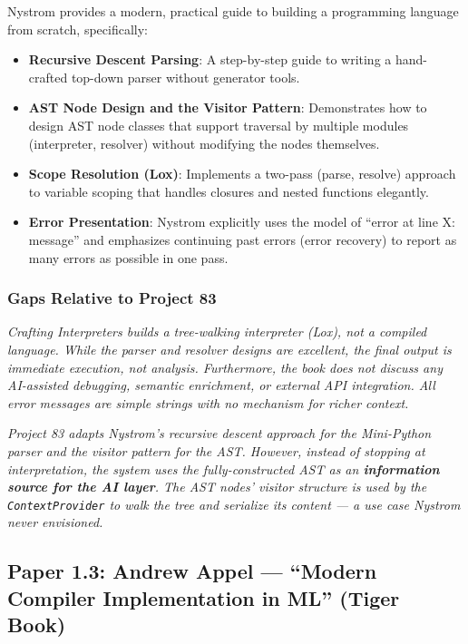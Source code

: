 \documentclass[a4paper,11pt]{article}
\newcommand{\papergap}[1]{%
  \begin{tcolorbox}[colback=red!5!white, colframe=red!60!black, title={Research Gap Identified}]
  \textit{#1}
  \end{tcolorbox}
}
\newcommand{\oursolution}[1]{%
  \begin{tcolorbox}[colback=green!5!white, colframe=green!60!black, title={How Project 83 Solves This Gap}]
  \textit{#1}
  \end{tcolorbox}
}
\begin{document}
Nystrom provides a modern, practical guide to building a programming language from scratch, specifically:
\begin{itemize}
    \item \textbf{Recursive Descent Parsing}: A step-by-step guide to writing a hand-crafted top-down parser without generator tools.
    \item \textbf{AST Node Design and the Visitor Pattern}: Demonstrates how to design AST node classes that support traversal by multiple modules (interpreter, resolver) without modifying the nodes themselves.
    \item \textbf{Scope Resolution (Lox)}: Implements a two-pass (parse, resolve) approach to variable scoping that handles closures and nested functions elegantly.
    \item \textbf{Error Presentation}: Nystrom explicitly uses the model of ``error at line X: message'' and emphasizes continuing past errors (error recovery) to report as many errors as possible in one pass.
\end{itemize}

\subsubsection{Gaps Relative to Project 83}

\papergap{Crafting Interpreters builds a tree-walking interpreter (Lox), not a compiled language. While the parser and resolver designs are excellent, the final output is immediate execution, not analysis. Furthermore, the book does not discuss any AI-assisted debugging, semantic enrichment, or external API integration. All error messages are simple strings with no mechanism for richer context.}

\oursolution{Project 83 adapts Nystrom's recursive descent approach for the Mini-Python parser and the visitor pattern for the AST. However, instead of stopping at interpretation, the system uses the fully-constructed AST as an \textbf{information source for the AI layer}. The AST nodes' visitor structure is used by the \texttt{ContextProvider} to walk the tree and serialize its content --- a use case Nystrom never envisioned.}

\subsection{Paper 1.3: Andrew Appel --- ``Modern Compiler Implementation in ML'' (Tiger Book)}
\end{document}
